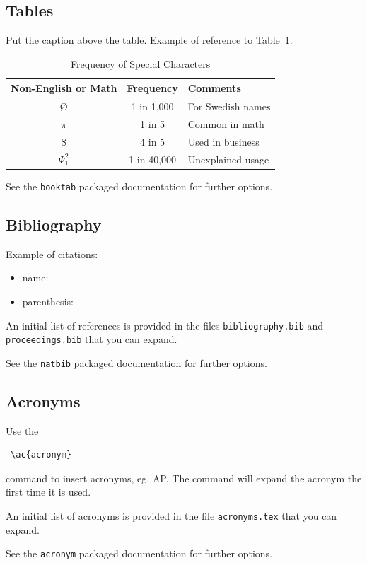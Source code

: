 \documentclass{ceurart}
\begin{document}
\subsection{Tables}

Put the caption above the table. Example of reference to Table~\ref{tab:sample-table}.

\begin{table}
  \caption{Frequency of Special Characters}
  \label{tab:sample-table}
  \centering
  \begin{tabular}{|c|c|l|}
    \toprule
    Non-English or Math&Frequency&Comments\\
    \midrule
    \O & 1 in 1,000& For Swedish names\\
    $\pi$ & 1 in 5& Common in math\\
    \$ & 4 in 5 & Used in business\\
    $\Psi^2_1$ & 1 in 40,000& Unexplained usage\\
  \bottomrule
\end{tabular}
\end{table}

See the \texttt{booktab} packaged documentation for further options.

\subsection{Bibliography}

Example of citations:
\begin{itemize}
	\item name: \citet{Salton1968}
	\item parenthesis: \citep{Salton1968}
\end{itemize}

An initial list of references is provided in the files \texttt{bibliography.bib} and \texttt{proceedings.bib} that you can expand.

See the \texttt{natbib} packaged documentation for further options.

\subsection{Acronyms}

Use the 

\begin{verbatim}
 \ac{acronym}
 \end{verbatim}

command to insert acronyms, eg. \ac{AP}. The command will expand the acronym the first time it is used.

An initial list of acronyms is provided in the file \texttt{acronyms.tex} that you can expand.

See the \texttt{acronym} packaged documentation for further options.
\fi




\end{document}
